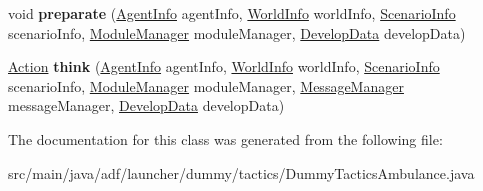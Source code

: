 \begin{DoxyCompactItemize}
\item 
\hypertarget{classadf_1_1launcher_1_1dummy_1_1tactics_1_1DummyTacticsAmbulance_afe5d0ed08352dbd161fcfcf065e39417}{}\label{classadf_1_1launcher_1_1dummy_1_1tactics_1_1DummyTacticsAmbulance_afe5d0ed08352dbd161fcfcf065e39417} 
void {\bfseries preparate} (\hyperlink{classadf_1_1agent_1_1info_1_1AgentInfo}{Agent\+Info} agent\+Info, \hyperlink{classadf_1_1agent_1_1info_1_1WorldInfo}{World\+Info} world\+Info, \hyperlink{classadf_1_1agent_1_1info_1_1ScenarioInfo}{Scenario\+Info} scenario\+Info, \hyperlink{classadf_1_1agent_1_1module_1_1ModuleManager}{Module\+Manager} module\+Manager, \hyperlink{classadf_1_1agent_1_1develop_1_1DevelopData}{Develop\+Data} develop\+Data)
\item 
\hypertarget{classadf_1_1launcher_1_1dummy_1_1tactics_1_1DummyTacticsAmbulance_a64caa7e1fee6348485753c247427777a}{}\label{classadf_1_1launcher_1_1dummy_1_1tactics_1_1DummyTacticsAmbulance_a64caa7e1fee6348485753c247427777a} 
\hyperlink{classadf_1_1agent_1_1action_1_1Action}{Action} {\bfseries think} (\hyperlink{classadf_1_1agent_1_1info_1_1AgentInfo}{Agent\+Info} agent\+Info, \hyperlink{classadf_1_1agent_1_1info_1_1WorldInfo}{World\+Info} world\+Info, \hyperlink{classadf_1_1agent_1_1info_1_1ScenarioInfo}{Scenario\+Info} scenario\+Info, \hyperlink{classadf_1_1agent_1_1module_1_1ModuleManager}{Module\+Manager} module\+Manager, \hyperlink{classadf_1_1agent_1_1communication_1_1MessageManager}{Message\+Manager} message\+Manager, \hyperlink{classadf_1_1agent_1_1develop_1_1DevelopData}{Develop\+Data} develop\+Data)
\end{DoxyCompactItemize}


The documentation for this class was generated from the following file\+:\begin{DoxyCompactItemize}
\item 
src/main/java/adf/launcher/dummy/tactics/Dummy\+Tactics\+Ambulance.\+java\end{DoxyCompactItemize}
